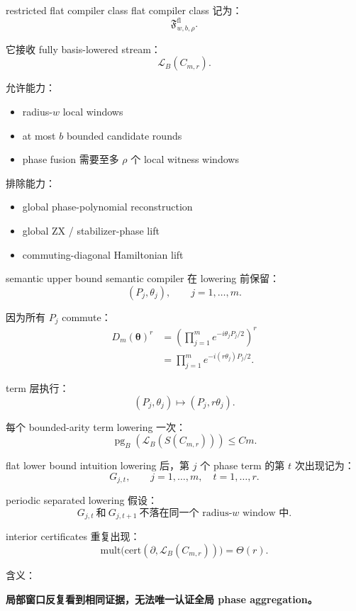 \documentclass[aspectratio=169,11pt]{ctexbeamer}
\newcommand{\basis}{\mathcal{L}_B}
\newcommand{\flatclass}{\mathfrak{F}^{\mathrm{fl}}_{w,b,\rho}}
\newcommand{\pg}{\operatorname{pg}_B}
\begin{document}
\begin{frame}{restricted flat compiler class}
  flat compiler class 记为：
  \[
    \flatclass.
  \]

  它接收 fully basis-lowered stream：
  \[
    \basis(C_{m,r}).
  \]

  允许能力：
  \begin{itemize}
    \item radius-$w$ local windows
    \item at most $b$ bounded candidate rounds
    \item phase fusion 需要至多 $\rho$ 个 local witness windows
  \end{itemize}

  排除能力：
  \begin{itemize}
    \item global phase-polynomial reconstruction
    \item global ZX / stabilizer-phase lift
    \item commuting-diagonal Hamiltonian lift
  \end{itemize}
\end{frame}

\begin{frame}{semantic upper bound}
  semantic compiler 在 lowering 前保留：
  \[
    (P_j,\theta_j),\qquad j=1,\ldots,m.
  \]

  因为所有 $P_j$ commute：
  \[
  \begin{aligned}
  D_m(\bm{\theta})^r
  &=
  \left(
    \prod_{j=1}^{m}e^{-i\theta_jP_j/2}
  \right)^r \\
  &=
  \prod_{j=1}^{m}e^{-i(r\theta_j)P_j/2}.
  \end{aligned}
  \]

  term 层执行：
  \[
    (P_j,\theta_j)\mapsto(P_j,r\theta_j).
  \]

  每个 bounded-arity term lowering 一次：
  \[
    \pg(\basis(S(C_{m,r})))\le C m.
  \]
\end{frame}

\begin{frame}{flat lower bound intuition}
  lowering 后，第 $j$ 个 phase term 的第 $t$ 次出现记为：
  \[
    G_{j,t},\qquad
    j=1,\ldots,m,\quad t=1,\ldots,r.
  \]

  periodic separated lowering 假设：
  \[
    G_{j,t}\ \text{和}\ G_{j,t+1}
    \ \text{不落在同一个 radius-}w\text{ window 中}.
  \]

  interior certificates 重复出现：
  \[
    \mathrm{mult}
    \bigl(
      \mathrm{cert}(\partial,\basis(C_{m,r}))
    \bigr)
    =
    \Theta(r).
  \]

  含义：
  \begin{center}
    \textbf{局部窗口反复看到相同证据，无法唯一认证全局 phase aggregation。}
  \end{center}
\end{frame}
\end{document}
